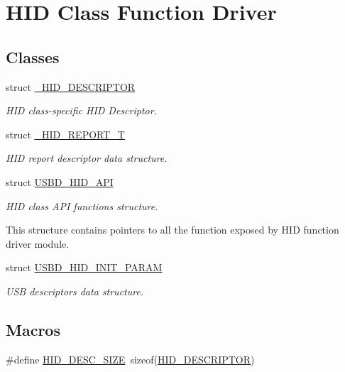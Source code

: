\hypertarget{group__USBD__HID}{}\section{H\+ID Class Function Driver}
\label{group__USBD__HID}
\subsection*{Classes}
\begin{DoxyCompactItemize}
\item 
struct \hyperlink{struct__HID__DESCRIPTOR}{\+\_\+\+H\+I\+D\+\_\+\+D\+E\+S\+C\+R\+I\+P\+T\+OR}
\begin{DoxyCompactList}\small\item\em H\+ID class-\/specific H\+ID Descriptor. \end{DoxyCompactList}\item 
struct \hyperlink{struct__HID__REPORT__T}{\+\_\+\+H\+I\+D\+\_\+\+R\+E\+P\+O\+R\+T\+\_\+T}
\begin{DoxyCompactList}\small\item\em H\+ID report descriptor data structure. \end{DoxyCompactList}\item 
struct \hyperlink{structUSBD__HID__API}{U\+S\+B\+D\+\_\+\+H\+I\+D\+\_\+\+A\+PI}
\begin{DoxyCompactList}\small\item\em H\+ID class A\+PI functions structure.

This structure contains pointers to all the function exposed by H\+ID function driver module. \end{DoxyCompactList}\item 
struct \hyperlink{structUSBD__HID__INIT__PARAM}{U\+S\+B\+D\+\_\+\+H\+I\+D\+\_\+\+I\+N\+I\+T\+\_\+\+P\+A\+R\+AM}
\begin{DoxyCompactList}\small\item\em U\+SB descriptors data structure. \end{DoxyCompactList}\end{DoxyCompactItemize}
\subsection*{Macros}
\begin{DoxyCompactItemize}
\item 
\#define \hyperlink{group__USBD__HID_ga5ff0f82d743784b185a3a82a726733d9}{H\+I\+D\+\_\+\+D\+E\+S\+C\+\_\+\+S\+I\+ZE}~sizeof(\hyperlink{group__USBD__HID_ga683d4339556ecbba7d2062c3f90336e8}{H\+I\+D\+\_\+\+D\+E\+S\+C\+R\+I\+P\+T\+OR})
\end{DoxyCompactItemize}
